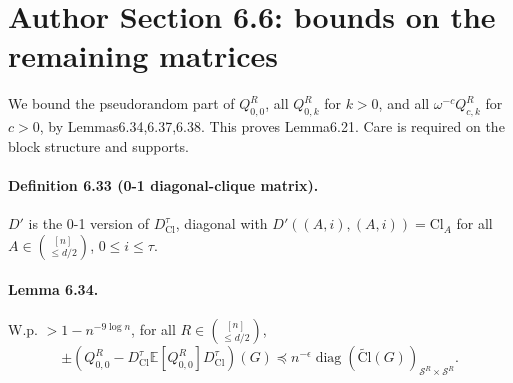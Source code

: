 \section*{Author Section 6.6: bounds on the remaining matrices}
We bound the pseudorandom part of $Q_{0,0}^R$, all $Q_{0,k}^R$ for $k>0$, and all $\omega^{-c}Q_{c,k}^R$ for $c>0$, by Lemmas6.34,6.37,6.38. This proves Lemma6.21. Care is required on the block structure and supports.
\paragraph{Definition 6.33 (0-1 diagonal-clique matrix).} $D'$ is the 0-1 version of $D_{\mathrm{Cl}}^\tau$, diagonal with $D'((A,i),(A,i))=\mathrm{Cl}_A$ for all $A\in\binom{[n]}{\le d/2}$, $0\le i\le\tau$.
\paragraph{Lemma 6.34.} W.p. $>1-n^{-9\log n}$, for all $R\in\binom{[n]}{\le d/2}$,
\[\pm(Q_{0,0}^R-D_{\mathrm{Cl}}^\tau\mathbb E[Q_{0,0}^R]D_{\mathrm{Cl}}^\tau)(G)\preceq n^{-\epsilon}\operatorname{diag}(\widetilde{\mathrm{Cl}}(G))_{\mathcal S^R\times\mathcal S^R}.\tag{6.65}\]
